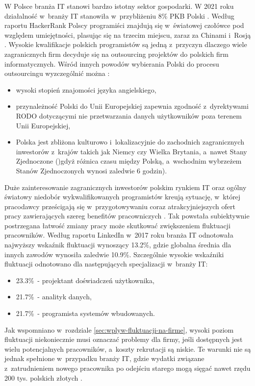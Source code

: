 W Polsce branża IT stanowi bardzo istotny sektor gospodarki.
W 2021 roku działalność w~branży IT stanowiła w~przybliżeniu 8\% PKB Polski \cite{piih-2021}.
Według raportu HackerRank Polscy programiści znajdują się w~światowej czołówce pod względem umiejętności, plasując się na trzecim miejscu, zaraz za Chinami i~Rosją \cite{hackerrank-2021}.
Wysokie kwalifikacje polskich programistów są jedną z~przyczyn dlaczego wiele zagranicznych firm decyduje się na outsourcing projektów do polskich firm informatycznych.
Wśród innych powodów wybierania Polski do procesu outsourcingu wyzczególnić można \cite{softwaremind-2021}:
\begin{itemize}
    \item wysoki stopień znajomości języka angielskiego,
    \item przynależność Polski do Unii Europejskiej zapewnia zgodność z~dyrektywami RODO dotyczącymi nie przetwarzania danych użytkowników poza terenem Unii Europejskiej,
    \item Polska jest zbliżona kulturowo i~lokalizacyjnie do zachodnich zagranicznych inwestorów z~krajów takich jak Niemcy czy Wielka Brytania, a~nawet Stany Zjednoczone ()gdyż różnica czasu między Polską, a~wschodnim wybrzeżem Stanów Zjednoczonych wynosi zaledwie 6 godzin).
\end{itemize}

Duże zainteresowanie zagranicznych inwestorów polskim rynkiem IT oraz ogólny światowy niedobór wykwalifikowanych programistów \cite{daxx-2021}
kreują sytuację, w~której pracodawcy prześcigają się w~przygotowywaniu coraz atrakcyjniejszych ofert pracy zawierających szereg benefitów pracowniczych \cite{it-benefits-2020}.
Tak powstała subiektywnie postrzegana łatwość zmiany pracy może skutkować zwiększeniem fluktuacji pracowników.
Według raportu LinkedIn \cite{linkedin-2018} w~2017 roku branża IT odnotowała najwyższy wskaźnik fluktuacji wynoszący 13.2\%, gdzie globalna średnia dla innych zawodów wynosiła zaledwie 10.9\%.
Szczególnie wysokie wskaźniki fluktuacji odnotowano dla następujących specjalizacji w~branży IT:
\begin{itemize}
    \item 23.3\%~- projektant doświadczeń użytkownika,
    \item 21.7\%~- analityk danych,
    \item 21.7\%~- programista systemów wbudowanych.
\end{itemize}

Jak wspomniano w~rozdziale \ref{sec:wplyw-fluktuacji-na-firme}, wysoki poziom fluktuacji niekoniecznie musi oznaczać problemy dla firmy, jeśli dostępnych jest wielu potencjalnych pracowników, a~koszty rekrutacji są niskie.
Te warunki nie są jednak spełnione w~przypadku branży IT, gdzie wydatki związane z~zatrudnieniem nowego pracownika po odejściu starego mogą sięgać nawet rzędu 200 tys. polskich złotych \cite{hairing-dev-2021}.


